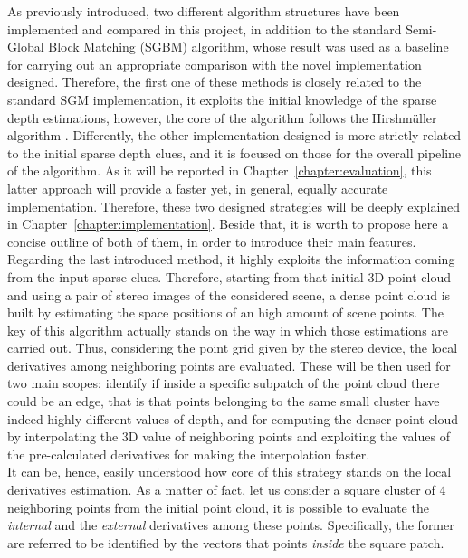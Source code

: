 As previously introduced, two different algorithm structures have been implemented and compared in this project, in addition to the standard Semi-Global Block Matching (SGBM) algorithm, whose result was used as a baseline for carrying out an appropriate comparison with the novel implementation designed. 
Therefore, the first one of these methods is closely related to the standard SGM implementation, it exploits the initial knowledge of the sparse depth estimations, however, the core of the algorithm follows the Hirshm\"{u}ller algorithm \cite{Hirschmuller2008}. 
Differently, the other implementation designed is more strictly related to the initial sparse depth clues, and it is focused on those for the overall pipeline of the algorithm.
As it will be reported in Chapter~\ref{chapter:evaluation}, this latter approach will provide a faster yet, in general, equally accurate implementation.
Therefore, these two designed strategies will be deeply explained in Chapter~\ref{chapter:implementation}.
Beside that, it is worth to propose here a concise outline of both of them, in order to introduce their main features.\\
Regarding the last introduced method, it highly exploits the information coming from the input sparse clues.
Therefore, starting from that initial 3D point cloud and using a pair of stereo images of the considered scene, a dense point cloud is built by estimating the space positions of an high amount of scene points. 
The key of this algorithm actually stands on the way in which those estimations are carried out. 
Thus, considering the point grid given by the stereo device, the local derivatives among neighboring points are evaluated. 
These will be then used for two main scopes: identify if inside a specific subpatch of the point cloud there could be an edge, that is that points belonging to the same small cluster have indeed highly different values of depth, and for computing the denser point cloud by interpolating the 3D value of neighboring points and exploiting the values of the pre-calculated derivatives for making the interpolation faster.\\
It can be, hence, easily understood how core of this strategy stands on the local derivatives estimation. 
As a matter of fact, let us consider a square cluster of 4 neighboring points from the initial point cloud, it is possible to evaluate the \textit{internal} and the \textit{external} derivatives among these points.
Specifically, the former are referred to be identified by the vectors that points \textit{inside} the square patch. 
